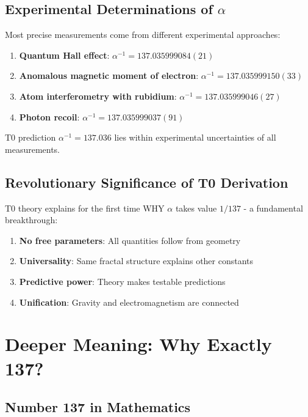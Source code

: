 \documentclass[12pt,a4paper]{article}
\theoremstyle{definition}
\begin{document}
	\subsection{Experimental Determinations of $\alpha$}
	
	Most precise measurements come from different experimental approaches:
	
	\begin{enumerate}
		\item \textbf{Quantum Hall effect}: $\alpha^{-1} = 137.035999084(21)$
		\item \textbf{Anomalous magnetic moment of electron}: $\alpha^{-1} = 137.035999150(33)$
		\item \textbf{Atom interferometry with rubidium}: $\alpha^{-1} = 137.035999046(27)$
		\item \textbf{Photon recoil}: $\alpha^{-1} = 137.035999037(91)$
	\end{enumerate}
	
	T0 prediction $\alpha^{-1} = 137.036$ lies within experimental uncertainties of all measurements.
	
	\subsection{Revolutionary Significance of T0 Derivation}
	
	T0 theory explains for the first time WHY $\alpha$ takes value $1/137$ - a fundamental breakthrough:
	
	\begin{enumerate}
		\item \textbf{No free parameters}: All quantities follow from geometry
		\item \textbf{Universality}: Same fractal structure explains other constants
		\item \textbf{Predictive power}: Theory makes testable predictions
		\item \textbf{Unification}: Gravity and electromagnetism are connected
	\end{enumerate}
	
	\section{Deeper Meaning: Why Exactly 137?}
	
	\subsection{Number 137 in Mathematics}
	
\end{document}
